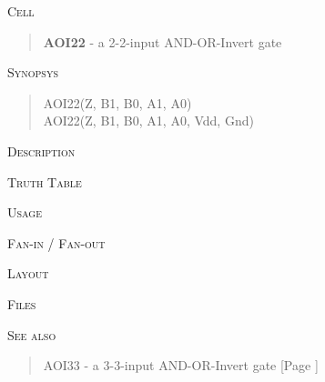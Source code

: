 
\label{AOI22}
\textsc{Cell}
\begin{quote}
    \textbf{AOI22} - a 2-2-input AND-OR-Invert gate
\end{quote}

\textsc{Synopsys}
\begin{quote}
    AOI22(Z, B1, B0, A1, A0) \\
    AOI22(Z, B1, B0, A1, A0, Vdd, Gnd)
\end{quote}

\textsc{Description}

%

\textsc{Truth Table}


\textsc{Usage}

\textsc{Fan-in / Fan-out}

\textsc{Layout}

\textsc{Files}

\textsc{See also}
\begin{quote}
    AOI33 - a 3-3-input AND-OR-Invert gate [Page \pageref{AOI33}]
\end{quote}
